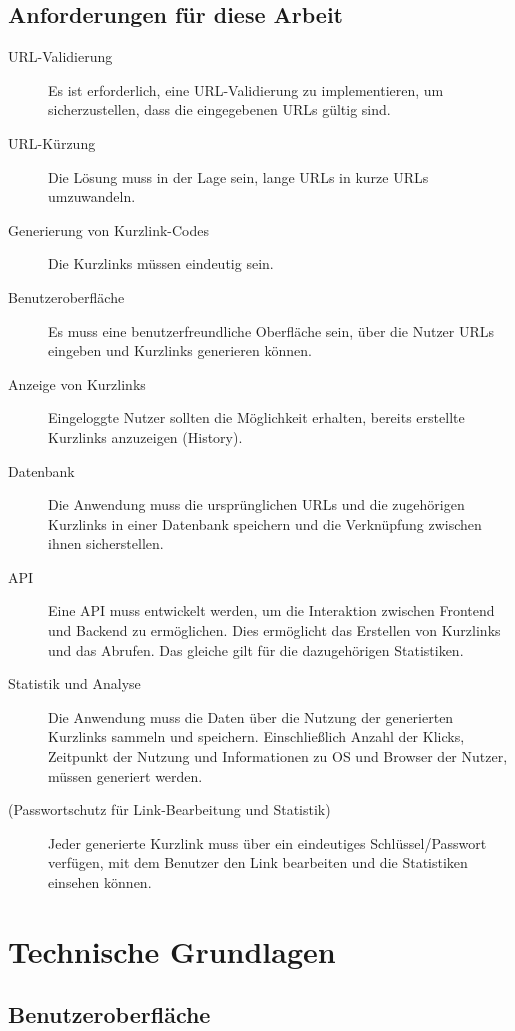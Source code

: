 \documentclass[a4paper,11pt,DIV=12,overfullrule=on]{scrreprt}
\begin{document}
\section{Anforderungen für diese Arbeit}
\begin{description}
    \item[URL-Validierung] Es ist erforderlich, eine URL-Validierung zu implementieren, um sicherzustellen, dass die eingegebenen URLs gültig sind.
    \item[URL-Kürzung] Die Lösung muss in der Lage sein, lange URLs in kurze URLs umzuwandeln.
    \item[Generierung von Kurzlink-Codes] Die Kurzlinks müssen eindeutig sein.
    \item[Benutzeroberfläche] Es muss eine benutzerfreundliche Oberfläche sein, über die Nutzer URLs eingeben und Kurzlinks generieren können.
    \item[Anzeige von Kurzlinks] Eingeloggte Nutzer sollten die Möglichkeit erhalten, bereits erstellte Kurzlinks anzuzeigen (History).
    \item[Datenbank] Die Anwendung muss die ursprünglichen URLs und die zugehörigen Kurzlinks in einer Datenbank speichern und die Verknüpfung zwischen ihnen sicherstellen.
    \item[API] Eine API muss entwickelt werden, um die Interaktion zwischen Frontend und Backend zu ermöglichen. Dies ermöglicht das Erstellen von Kurzlinks und das Abrufen. Das gleiche gilt für die dazugehörigen Statistiken.
    \item[Statistik und Analyse] Die Anwendung muss die Daten über die Nutzung der generierten Kurzlinks sammeln und speichern. Einschließlich Anzahl der Klicks, Zeitpunkt der Nutzung und Informationen zu OS und Browser der Nutzer, müssen generiert werden.
    \item[(Passwortschutz für Link-Bearbeitung und Statistik)] Jeder generierte Kurzlink muss über ein eindeutiges Schlüssel/Passwort verfügen, mit dem Benutzer den Link bearbeiten und die Statistiken einsehen können.
\end{description}

\chapter{Technische Grundlagen}
\section{Benutzeroberfläche}
\end{document}
